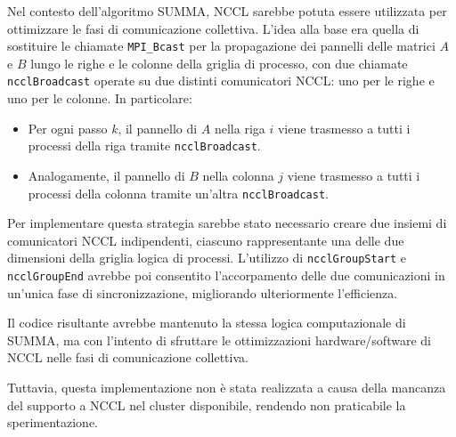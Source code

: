 \documentclass[a4paper]{article}
\begin{document}
Nel contesto dell’algoritmo SUMMA, NCCL sarebbe potuta essere utilizzata per ottimizzare le fasi di comunicazione collettiva.
L’idea alla base era quella di sostituire le chiamate \texttt{MPI\_Bcast} per la propagazione dei pannelli delle matrici $A$ e $B$ lungo le righe e le colonne della griglia di processo, con due chiamate \texttt{ncclBroadcast} operate su due distinti comunicatori NCCL: uno per le righe e uno per le colonne. In particolare:

\begin{itemize}
  \item Per ogni passo $k$, il pannello di $A$ nella riga $i$ viene trasmesso a tutti i processi della riga tramite \texttt{ncclBroadcast}.
  \item Analogamente, il pannello di $B$ nella colonna $j$ viene trasmesso a tutti i processi della colonna tramite un’altra \texttt{ncclBroadcast}.
\end{itemize}

Per implementare questa strategia sarebbe stato necessario creare due insiemi di comunicatori NCCL indipendenti, ciascuno rappresentante una delle due dimensioni della griglia logica di processi. L’utilizzo di \texttt{ncclGroupStart} e \texttt{ncclGroupEnd} avrebbe poi consentito l’accorpamento delle due comunicazioni in un’unica fase di sincronizzazione, migliorando ulteriormente l'efficienza.

Il codice risultante avrebbe mantenuto la stessa logica computazionale di SUMMA, ma con l'intento di sfruttare le ottimizzazioni hardware/software di NCCL nelle fasi di comunicazione collettiva.

Tuttavia, questa implementazione non è stata realizzata a causa della mancanza del supporto a NCCL nel cluster disponibile, rendendo non praticabile la sperimentazione.


\printbibliography
\end{document}
